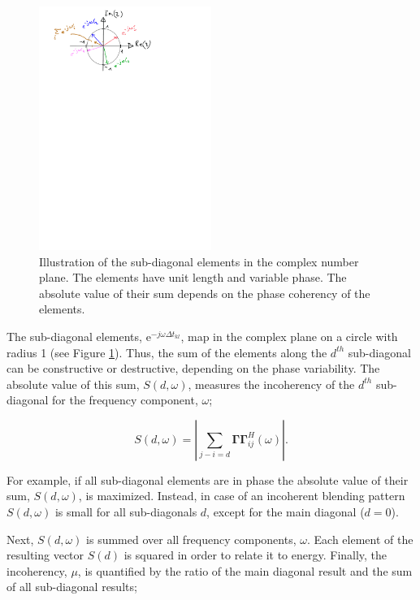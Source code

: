 \begin{figure}
	\centering
	\includegraphics[width = 0.5\textwidth]{Plots/complex-circle}
	\caption{Illustration of the sub-diagonal elements in the complex number plane. The elements have unit length and variable phase. The absolute value of their sum depends on the phase coherency of the elements.}
	\label{fig:Ch-Results-complex-circle}
\end{figure}

The sub-diagonal elements, $\mathrm{e}^{-j \omega \Delta t_{kl}}$, map in the complex plane on a circle with radius 1 (see Figure \ref{fig:Ch-Results-complex-circle}). Thus, the sum of the elements along the $d^{th}$ sub-diagonal can be constructive or destructive, depending on the phase variability. The absolute value of this sum, $S(d,\omega)$, measures the incoherency of the $d^{th}$ sub-diagonal for the frequency component, $\omega$;

\begin{equation}
	S(d,\omega) = \left| \sum_{j-i=d} \mathbf{\Gamma \Gamma}^H_{ij} (\omega) \right|.
	\label{eq:Ch-Results-incoherency-diagsum}	
\end{equation} 

For example, if all sub-diagonal elements are in phase the absolute value of their sum, $S(d,\omega)$, is maximized. Instead, in case of an incoherent blending pattern $S(d,\omega)$ is small for all sub-diagonals $d$, except for the main diagonal ($d = 0$).  

Next, $S(d,\omega)$ is summed over all frequency components, $\omega$. Each element of the resulting vector $S(d)$ is squared in order to relate it to energy. Finally, the incoherency, $\mu$, is quantified by the ratio of the main diagonal result and the sum of all sub-diagonal results;

